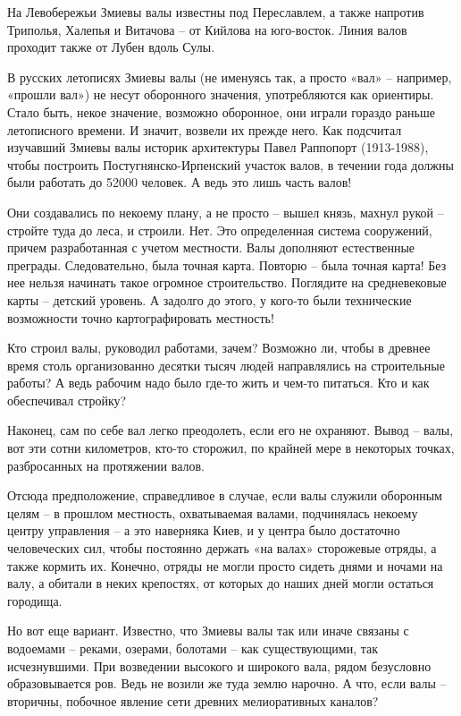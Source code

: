 На Левобережьи Змиевы валы известны под Переславлем, а также напротив Триполья, Халепья и Витачова – от Кийлова на юго-восток. Линия валов проходит также от Лубен вдоль Сулы.

В русских летописях Змиевы валы (не именуясь так, а просто «вал» – например, «прошли вал») не несут оборонного значения, употребляются как ориентиры. Стало быть, некое значение, возможно оборонное, они играли гораздо раньше летописного времени. И значит, возвели их прежде него. Как подсчитал изучавший Змиевы валы историк архитектуры Павел Раппопорт (1913-1988), чтобы построить Постугнянско-Ирпенский участок валов, в течении года должны были работать до 52000 человек. А ведь это лишь часть валов!

Они создавались по некоему плану, а не просто – вышел князь, махнул рукой – стройте туда до леса, и строили. Нет. Это определенная система сооружений, причем разработанная с учетом местности. Валы дополняют естественные преграды. Следовательно, была точная карта. Повторю – была точная карта! Без нее нельзя начинать такое огромное строительство. Поглядите на средневековые карты – детский уровень. А задолго до этого, у кого-то были технические возможности точно картографировать местность!

Кто строил валы, руководил работами, зачем? Возможно ли, чтобы в древнее время столь организованно десятки тысяч людей направлялись на строительные работы? А ведь рабочим надо было где-то жить и чем-то питаться. Кто и как обеспечивал стройку?

Наконец, сам по себе вал легко преодолеть, если его не охраняют. Вывод – валы, вот эти сотни километров, кто-то сторожил, по крайней мере в некоторых точках, разбросанных на протяжении валов.

Отсюда предположение, справедливое в случае, если валы служили оборонным целям – в прошлом местность, охватываемая валами, подчинялась некоему центру управления – а это наверняка Киев, и у центра было достаточно человеческих сил, чтобы постоянно держать «на валах» сторожевые отряды, а также кормить их. Конечно, отряды не могли просто сидеть днями и ночами на валу, а обитали в неких крепостях, от которых до наших дней могли остаться городища.

Но вот еще вариант. Известно, что Змиевы валы так или иначе связаны с водоемами – реками, озерами, болотами – как существующими, так исчезнувшими. При возведении высокого и широкого вала, рядом безусловно образовывается ров. Ведь не возили же туда землю нарочно. А что, если валы – вторичны, побочное явление сети древних мелиоративных каналов?

